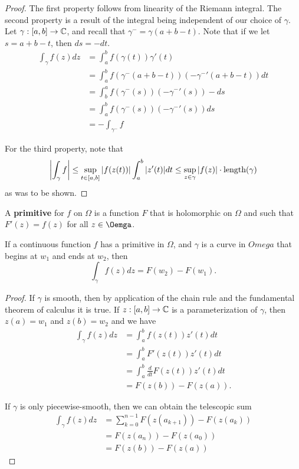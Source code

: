 \documentclass{exam}
\begin{document}
\begin{proof}
    The first property follows from linearity of the Riemann integral. The second property is a result of the integral being independent
    of our choice of $\gamma$. Let $\gamma: [a, b]\to \mathbb{C}$, and recall that $\gamma^- = \gamma(a + b - t)$. Note that if we let $s = a + b - t$, then 
    $ds = -dt$.
    \begin{align*}
        \int_\gamma f(z)dz &= \int_a^b f(\gamma(t))\gamma'(t) \\
        &= \int_a^b f(\gamma^-(a + b - t))(-\gamma^-'(a + b - t))dt \\
        &= \int_b^a f(\gamma^-(s))(-\gamma^-'(s))-ds \\
        &= \int_a^b f(\gamma^-(s))(-\gamma^-'(s))ds \\
        &= -\int_{\gamma^-} f
    \end{align*}

    For the third property, note that
    $$\left| \int_\gamma f \right| \leq \sup_{t\in[a, b]}\left| f(z(t)) \right|\int_a^b |z'(t)|dt \leq \sup_{z\in\gamma} \left| f(z) \right| \cdot \text{length}(\gamma)$$
    as was to be shown.
\end{proof}

A \textbf{primitive} for $f$ on $\Omega$ is a function $F$ that is holomorphic on $\Omega$ and such that $F'(z) = f(z)$ for all $z\in\Oemga$. 
\noqed
\begin{theorem}\label{thm:main}
    If a continuous function $f$ has a primitive in $\Omega$, and $\gamma$ is a curve in $Omega$ that begins at $w_1$ and ends at $w_2$, then
    $$\int_\gamma f(z) dz = F(w_2) - F(w_1).$$
\end{theorem}
\yesqed
\begin{proof}
    If $\gamma$ is smooth, then by application of the chain rule and the fundamental theorem of calculus it is true. If $z: [a, b]\to\mathbb{C}$
    is a parameterization of $\gamma$, then $z(a) = w_1$ and $z(b) = w_2$ and we have
    \begin{align*}
        \int_\gamma f(z)dz &= \int_a^b f(z(t))z'(t)dt \\
        &= \int_a^b F'(z(t))z'(t)dt \\
        &= \int_a^b \frac{d}{dt} F(z(t))z'(t)dt \\
        &= F(z(b)) - F(z(a)).
    \end{align*}

    If $\gamma$ is only piecewise-smooth, then we can obtain the telescopic sum
    \begin{align*}
        \int_\gamma f(z)dz &= \sum_{k = 0}^{n - 1}F(z(a_{k + 1})) - F(z(a_k)) \\
        &= F(z(a_n)) - F(z(a_0)) \\
        &= F(z(b)) - F(z(a))
    \end{align*}
\end{proof}
\end{document}
